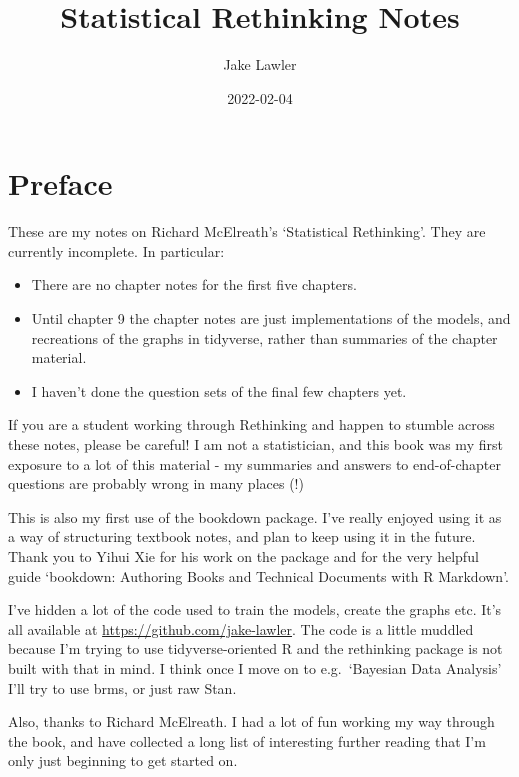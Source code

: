 \documentclass[
]{book}
\title{Statistical Rethinking Notes}
\author{Jake Lawler}
\date{2022-02-04}
\providecommand{\tightlist}{%
  \setlength{\itemsep}{0pt}\setlength{\parskip}{0pt}}
\begin{document}
\maketitle

{
\setcounter{tocdepth}{1}
\tableofcontents
}
\hypertarget{preface}{%
\chapter*{Preface}\label{preface}}

These are my notes on Richard McElreath's `Statistical Rethinking'. They are currently incomplete. In particular:

\begin{itemize}
\tightlist
\item
  There are no chapter notes for the first five chapters.
\item
  Until chapter 9 the chapter notes are just implementations of the models, and recreations of the graphs in tidyverse, rather than summaries of the chapter material.
\item
  I haven't done the question sets of the final few chapters yet.
\end{itemize}

If you are a student working through Rethinking and happen to stumble across these notes, please be careful! I am not a statistician, and this book was my first exposure to a lot of this material - my summaries and answers to end-of-chapter questions are probably wrong in many places (!)

This is also my first use of the bookdown package. I've really enjoyed using it as a way of structuring textbook notes, and plan to keep using it in the future. Thank you to Yihui Xie for his work on the package and for the very helpful guide `bookdown: Authoring Books and Technical Documents with R Markdown'.

I've hidden a lot of the code used to train the models, create the graphs etc. It's all available at \url{https://github.com/jake-lawler}. The code is a little muddled because I'm trying to use tidyverse-oriented R and the rethinking package is not built with that in mind. I think once I move on to e.g.~`Bayesian Data Analysis' I'll try to use brms, or just raw Stan.

Also, thanks to Richard McElreath. I had a lot of fun working my way through the book, and have collected a long list of interesting further reading that I'm only just beginning to get started on.
\end{document}
